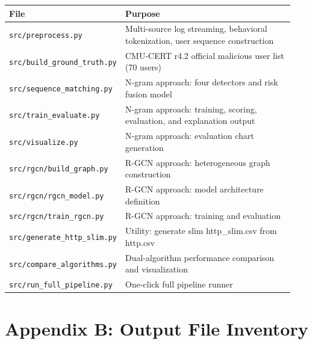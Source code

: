 \documentclass[
  a4paper,
  11pt]{article}
\newcounter{none} %
\begin{document}
{\def\LTcaptype{none} %
\begin{longtable}[]{@{}>{\raggedright\arraybackslash}p{0.28\linewidth}>{\raggedright\arraybackslash}p{0.66\linewidth}@{}}
\toprule\noalign{}
File & Purpose \\
\midrule\noalign{}
\endhead
\bottomrule\noalign{}
\endlastfoot
\texttt{src/preprocess.py} & Multi-source log streaming, behavioral
tokenization, user sequence construction \\
\texttt{src/build\_ground\_truth.py} & CMU-CERT r4.2 official malicious
user list (70 users) \\
\texttt{src/sequence\_matching.py} & N-gram approach: four detectors and
risk fusion model \\
\texttt{src/train\_evaluate.py} & N-gram approach: training, scoring,
evaluation, and explanation output \\
\texttt{src/visualize.py} & N-gram approach: evaluation chart
generation \\
\texttt{src/rgcn/build\_graph.py} & R-GCN approach: heterogeneous graph
construction \\
\texttt{src/rgcn/rgcn\_model.py} & R-GCN approach: model architecture
definition \\
\texttt{src/rgcn/train\_rgcn.py} & R-GCN approach: training and
evaluation \\
\texttt{src/generate\_http\_slim.py} & Utility: generate slim
http\_slim.csv from http.csv \\
\texttt{src/compare\_algorithms.py} & Dual-algorithm performance
comparison and visualization \\
\texttt{src/run\_full\_pipeline.py} & One-click full pipeline runner \\
\end{longtable}
}

\section{Appendix B: Output File
Inventory}\label{appendix-b-output-file-inventory}
\end{document}
